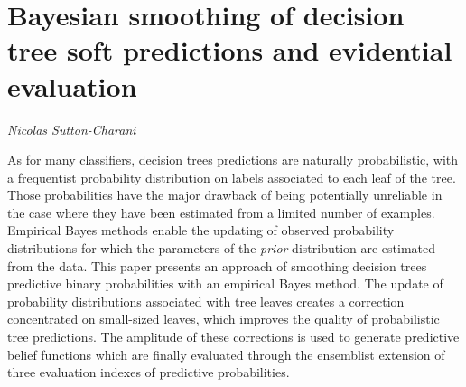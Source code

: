 \documentclass[../booklet.tex]{subfiles}
\begin{document}
\section[Bayesian smoothing of decision tree soft predictions and evidential evaluation. {\it Nicolas Sutton-Charani}]{Bayesian smoothing of decision tree soft predictions and evidential evaluation}

\begin{center}
  {\it Nicolas Sutton-Charani}
\end{center}

\vskip 0.8cm


As for many classifiers, decision trees predictions are naturally probabilistic, with a frequentist probability distribution on labels associated to each leaf of the tree. 
	Those probabilities have the major drawback of being potentially unreliable in the case where they have been estimated from a limited number of examples.
	Empirical Bayes methods enable the updating of observed probability distributions for which the parameters of the \textit{prior} distribution are estimated from the data. 
	This paper presents an approach of smoothing decision trees predictive binary probabilities with an empirical Bayes method. 
	The update of probability distributions associated with tree leaves creates a correction concentrated on small-sized leaves, which improves the quality of probabilistic tree predictions.
	The amplitude of these corrections is used to generate predictive belief functions which are finally evaluated through the ensemblist extension of three evaluation indexes of predictive probabilities.

\end{document}
